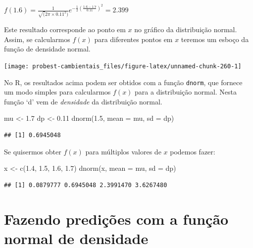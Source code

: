 \documentclass[
]{book}
\newenvironment{Shaded}{\begin{snugshade}}{\end{snugshade}}
\newcommand{\AttributeTok}[1]{\textcolor[rgb]{0.77,0.63,0.00}{#1}}
\newcommand{\FloatTok}[1]{\textcolor[rgb]{0.00,0.00,0.81}{#1}}
\newcommand{\FunctionTok}[1]{\textcolor[rgb]{0.00,0.00,0.00}{#1}}
\newcommand{\NormalTok}[1]{#1}
\newcommand{\OtherTok}[1]{\textcolor[rgb]{0.56,0.35,0.01}{#1}}
\begin{document}
\(f(1.6) = \frac{1}{\sqrt(2\pi \times0.11^2)}e^{-\frac{1}{2}(\frac{1.6 - 1.7}{0.11})^2} = 2.399\)

Este resultado corresponde ao ponto em \(x\) no gráfico da distribuição normal. Assim, se calcularmos \(f(x)\) para diferentes pontos em \(x\) teremos um esboço da função de densidade normal.

\begin{center}\texttt{[image: probest-cambientais\_files/figure-latex/unnamed-chunk-260-1]} \end{center}

No R, os resultados acima podem ser obtidos com a função \texttt{dnorm}, que fornece um modo simples para calcularmos \(f(x)\) para a distribuição normal. Nesta função `d' vem de \emph{densidade} da distribuição normal.

\begin{Shaded}
\begin{Highlighting}[]
\NormalTok{mu }\OtherTok{\textless{}{-}} \FloatTok{1.7}
\NormalTok{dp }\OtherTok{\textless{}{-}} \FloatTok{0.11}
\FunctionTok{dnorm}\NormalTok{(}\FloatTok{1.5}\NormalTok{, }\AttributeTok{mean =}\NormalTok{ mu, }\AttributeTok{sd =}\NormalTok{ dp)}
\end{Highlighting}
\end{Shaded}

\begin{verbatim}
## [1] 0.6945048
\end{verbatim}

Se quisermos obter \(f(x)\) para múltiplos valores de \(x\) podemos fazer:

\begin{Shaded}
\begin{Highlighting}[]
\NormalTok{x }\OtherTok{\textless{}{-}} \FunctionTok{c}\NormalTok{(}\FloatTok{1.4}\NormalTok{, }\FloatTok{1.5}\NormalTok{, }\FloatTok{1.6}\NormalTok{, }\FloatTok{1.7}\NormalTok{)}
\FunctionTok{dnorm}\NormalTok{(x, }\AttributeTok{mean =}\NormalTok{ mu, }\AttributeTok{sd =}\NormalTok{ dp)}
\end{Highlighting}
\end{Shaded}

\begin{verbatim}
## [1] 0.0879777 0.6945048 2.3991470 3.6267480
\end{verbatim}

\hypertarget{fazendo-prediuxe7uxf5es-com-a-funuxe7uxe3o-normal-de-densidade}{%
\section{Fazendo predições com a função normal de densidade}\label{fazendo-prediuxe7uxf5es-com-a-funuxe7uxe3o-normal-de-densidade}}
\end{document}
